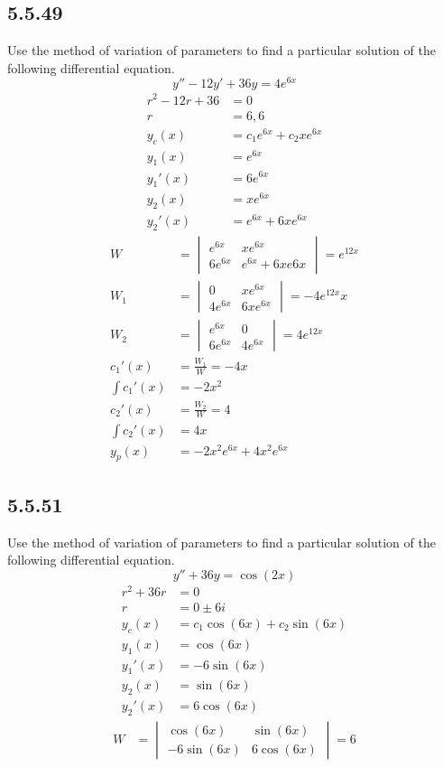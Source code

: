 \documentclass{article}
\begin{document}
\subsection{5.5.49}
Use the method of variation of parameters to find a particular solution of the following differential equation.
$$ y'' - 12y' + 36y = 4e^{6x} $$
\begin{align*}
	r^2 - 12r + 36 & = 0 \\
	r & = 6, 6 \\
	y_c(x) & = c_1e^{6x} + c_2xe^{6x} \\
	y_1(x) & = e^{6x} \\
	y_1'(x) & = 6e^{6x} \\
	y_2(x) & = xe^{6x} \\
	y_2'(x) & = e^{6x} + 6xe^{6x}
\end{align*}
\begin{align*}
	W & =
		\begin{vmatrix}
			e^{6x} & xe^{6x} \\
			6e^{6x} & e^{6x} + 6xe{6x}
		\end{vmatrix} = e^{12x} \\
	W_1 & =
		\begin{vmatrix}
			0 & xe^{6x} \\
			4e^{6x} & 6xe^{6x}
		\end{vmatrix} = -4e^{12x}x \\
	W_2 & =
		\begin{vmatrix}
			e^{6x} & 0 \\
			6e^{6x} & 4e^{6x}
		\end{vmatrix} = 4e^{12x} \\
	c_1'(x) & = \frac{W_1}{W} = -4x \\
	\int c_1'(x) & = -2x^2 \\
	c_2'(x) & = \frac{W_2}{W} = 4 \\
	\int c_2'(x) & = 4x \\
	y_p(x) & = -2x^2e^{6x} + 4x^2e^{6x}
\end{align*}

\subsection{5.5.51}
Use the method of variation of parameters to find a particular solution of the following differential equation.
$$ y'' + 36y = \cos(2x) $$
\begin{align*}
	r^2 + 36r & = 0 \\
	r & = 0 \pm 6i \\
	y_c(x) & = c_1\cos(6x) + c_2\sin(6x) \\
	y_1(x) & = \cos(6x) \\
	y_1'(x) & = -6\sin(6x) \\
	y_2(x) & = \sin(6x) \\
	y_2'(x) & = 6\cos(6x)
\end{align*}
\begin{align*}
	W & =
		\begin{vmatrix}
			\cos(6x) & \sin(6x) \\
			-6\sin(6x) & 6\cos(6x)
		\end{vmatrix} = 6 \\
\end{align*}
\end{document}
